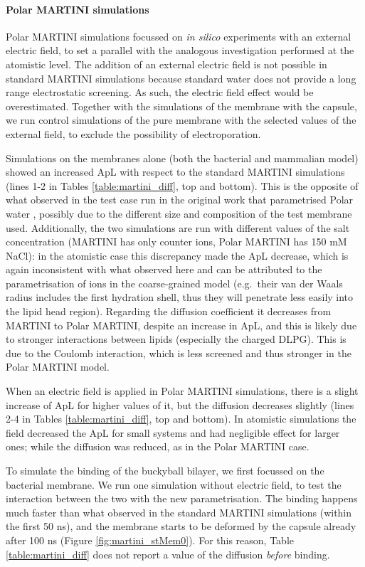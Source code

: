 \paragraph{Polar MARTINI simulations} 
Polar MARTINI simulations focussed on \emph{in silico} experiments with an external electric field, to set a parallel with the analogous investigation performed at the atomistic level. The addition of an external electric field is not possible in standard MARTINI simulations because standard water does not provide a long range electrostatic screening. As such, the electric field effect would be overestimated.
%
Together with the simulations of the membrane with the capsule, we run control simulations of the pure membrane with the selected values of the external field, to exclude the possibility of electroporation.

Simulations on the membranes alone (both the bacterial and mammalian model) showed an increased ApL with respect to the standard MARTINI simulations (lines 1-2 in Tables \ref{table:martini_diff}, top and bottom). This is the opposite of what observed in the test case run in the original work that parametrised Polar water \citep{Yesylevskyy2010}, possibly due to the different size and composition of the test membrane used.
%
Additionally, the two simulations are run with different values of the salt concentration (MARTINI has only counter ions, Polar MARTINI has 150 mM NaCl): in the atomistic case this discrepancy made the ApL decrease, which is again inconsistent with what observed here and can be attributed to the parametrisation of ions in the coarse-grained model (e.g.\ their van der Waals radius includes the first hydration shell, thus they will penetrate less easily into the lipid head region).
%
Regarding the diffusion coefficient it decreases from MARTINI to Polar MARTINI, despite an increase in ApL, and this is likely due to stronger interactions between lipids (especially the charged DLPG). This is due to the Coulomb interaction, which is less screened and thus stronger in the Polar MARTINI model.

When an electric field is applied in Polar MARTINI simulations, there is a slight increase of ApL for higher values of it, but the diffusion decreases slightly (lines 2-4 in Tables \ref{table:martini_diff}, top and bottom). In atomistic simulations the field decreased the ApL for small systems and had negligible effect for larger ones; while the diffusion was reduced, as in the Polar MARTINI case.

To simulate the binding of the buckyball bilayer, we first focussed on the bacterial membrane. We run one simulation without electric field, to test the interaction between the two with the new parametrisation. The binding happens much faster than what observed in the standard MARTINI simulations (within the first 50 ns), and the membrane starts to be deformed by the capsule already after 100 ns (Figure \ref{fig:martini_stMem0}). For this reason, Table \ref{table:martini_diff} does not report a value of the diffusion \emph{before} binding.


